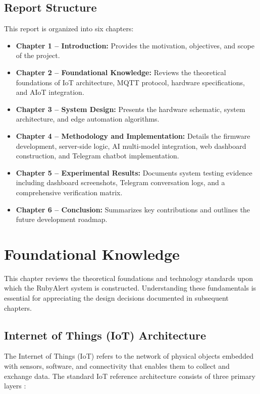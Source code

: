 \documentclass[12pt,a4paper]{report}
\begin{document}
\section{Report Structure}
This report is organized into six chapters:
\begin{itemize}[leftmargin=1.5cm]
    \item \textbf{Chapter 1 -- Introduction:} Provides the motivation, objectives, and scope of the project.
    \item \textbf{Chapter 2 -- Foundational Knowledge:} Reviews the theoretical foundations of IoT architecture, MQTT protocol, hardware specifications, and AIoT integration.
    \item \textbf{Chapter 3 -- System Design:} Presents the hardware schematic, system architecture, and edge automation algorithms.
    \item \textbf{Chapter 4 -- Methodology and Implementation:} Details the firmware development, server-side logic, AI multi-model integration, web dashboard construction, and Telegram chatbot implementation.
    \item \textbf{Chapter 5 -- Experimental Results:} Documents system testing evidence including dashboard screenshots, Telegram conversation logs, and a comprehensive verification matrix.
    \item \textbf{Chapter 6 -- Conclusion:} Summarizes key contributions and outlines the future development roadmap.
\end{itemize}


\chapter{Foundational Knowledge}
\label{ch:foundations}

This chapter reviews the theoretical foundations and technology standards upon which the RubyAlert system is constructed. Understanding these fundamentals is essential for appreciating the design decisions documented in subsequent chapters.

\section{Internet of Things (IoT) Architecture}
The Internet of Things (IoT) refers to the network of physical objects embedded with sensors, software, and connectivity that enables them to collect and exchange data. The standard IoT reference architecture consists of three primary layers \cite{mqtt}:
\end{document}
